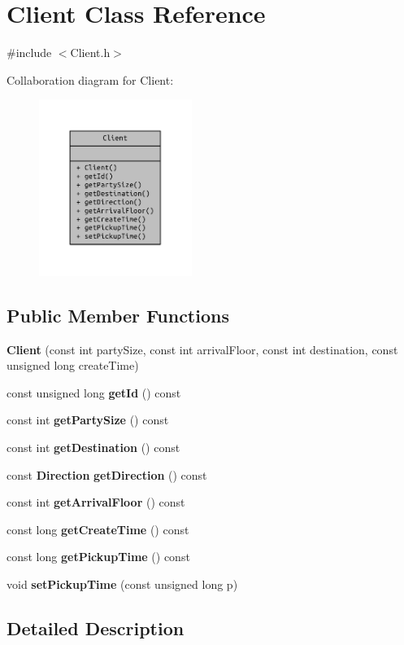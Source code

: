 \section{Client Class Reference}
\label{class_client}


{\ttfamily \#include $<$Client.\+h$>$}



Collaboration diagram for Client\+:
\nopagebreak
\begin{figure}[H]
\begin{center}
\leavevmode
\includegraphics[width=141pt]{class_client__coll__graph}
\end{center}
\end{figure}
\subsection*{Public Member Functions}
\begin{DoxyCompactItemize}
\item 
{\bf Client} (const int party\+Size, const int arrival\+Floor, const int destination, const unsigned long create\+Time)
\item 
const unsigned long {\bf get\+Id} () const 
\item 
const int {\bf get\+Party\+Size} () const 
\item 
const int {\bf get\+Destination} () const 
\item 
const {\bf Direction} {\bf get\+Direction} () const 
\item 
const int {\bf get\+Arrival\+Floor} () const 
\item 
const long {\bf get\+Create\+Time} () const 
\item 
const long {\bf get\+Pickup\+Time} () const 
\item 
void {\bf set\+Pickup\+Time} (const unsigned long p)
\end{DoxyCompactItemize}


\subsection{Detailed Description}


